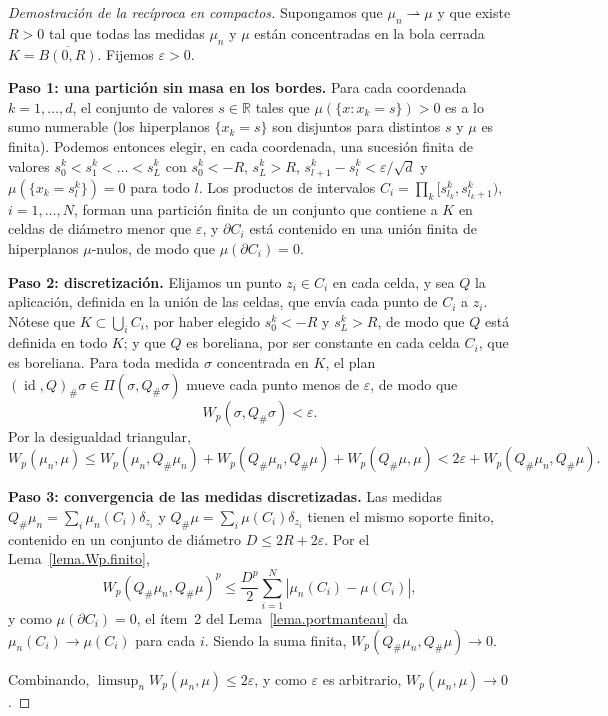 \documentclass[12pt, a4paper]{amsbook}
\newcommand{\id}{\operatorname{id}}
\newcommand{\R}{{\mathbb R}}
\theoremstyle{remark}
\theoremstyle{definition}
\numberwithin{section}{chapter}
\numberwithin{subsection}{section}
\numberwithin{equation}{section}
\numberwithin{figure}{chapter}
\begin{document}
\begin{proof}[Demostración de la recíproca en compactos]
Supongamos que $\mu_n\rightharpoonup\mu$ y que existe $R>0$ tal que todas
las medidas $\mu_n$ y $\mu$ están concentradas en la bola cerrada
$K=\overline{B(0,R)}$. Fijemos $\varepsilon>0$.

\medskip
\textbf{Paso 1: una partición sin masa en los bordes.} Para cada coordenada
$k=1,\dots,d$, el conjunto de valores $s\in\R$ tales que
$\mu(\{x:x_k=s\})>0$ es a lo sumo numerable (los hiperplanos $\{x_k=s\}$ son
disjuntos para distintos $s$ y $\mu$ es finita). Podemos entonces elegir, en
cada coordenada, una sucesión finita de valores $s^k_0<s^k_1<\dots<s^k_{L}$
con $s^k_0<-R$, $s^k_L>R$, $s^k_{l+1}-s^k_l<\varepsilon/\sqrt d$ y
$\mu(\{x_k=s^k_l\})=0$ para todo $l$. Los productos de intervalos
$C_i=\prod_k[s^k_{l_k},s^k_{l_k+1})$, $i=1,\dots,N$, forman una partición
finita de un conjunto que contiene a $K$ en celdas de
diámetro menor que $\varepsilon$, y $\partial C_i$ está contenido en una unión
finita de hiperplanos $\mu$-nulos, de modo que $\mu(\partial C_i)=0$.

\medskip
\textbf{Paso 2: discretización.} Elijamos un punto $z_i\in C_i$ en cada
celda, y sea $Q$ la aplicación, definida en la unión de las celdas, que envía
cada punto de $C_i$ a $z_i$. Nótese que $K\subset\bigcup_iC_i$, por haber
elegido $s^k_0<-R$ y $s^k_L>R$, de modo que $Q$ está definida en todo $K$; y
que $Q$ es boreliana, por ser constante en cada celda $C_i$, que es
boreliana. Para toda medida $\sigma$ concentrada en $K$, el
plan $(\id,Q)_\#\sigma\in\Pi(\sigma,Q_\#\sigma)$ mueve cada punto menos de
$\varepsilon$, de modo que
\[
W_p(\sigma,Q_\#\sigma)<\varepsilon.
\]
Por la desigualdad triangular,
\[
W_p(\mu_n,\mu)
\le W_p(\mu_n,Q_\#\mu_n)+W_p(Q_\#\mu_n,Q_\#\mu)+W_p(Q_\#\mu,\mu)
<2\varepsilon+W_p(Q_\#\mu_n,Q_\#\mu).
\]

\medskip
\textbf{Paso 3: convergencia de las medidas discretizadas.} Las medidas
$Q_\#\mu_n=\sum_i\mu_n(C_i)\delta_{z_i}$ y $Q_\#\mu=\sum_i\mu(C_i)\delta_{z_i}$
tienen el mismo soporte finito, contenido en un conjunto de diámetro
$D\le2R+2\varepsilon$. Por el Lema~\ref{lema.Wp.finito},
\[
W_p(Q_\#\mu_n,Q_\#\mu)^p\le\frac{D^p}{2}\sum_{i=1}^N|\mu_n(C_i)-\mu(C_i)|,
\]
y como $\mu(\partial C_i)=0$, el ítem~2 del Lema~\ref{lema.portmanteau} da
$\mu_n(C_i)\to\mu(C_i)$ para cada $i$. Siendo la suma finita,
$W_p(Q_\#\mu_n,Q_\#\mu)\to0$.

\medskip
Combinando, $\limsup_nW_p(\mu_n,\mu)\le2\varepsilon$, y como $\varepsilon$ es
arbitrario, $W_p(\mu_n,\mu)\to0$.
\end{proof}
\end{document}
